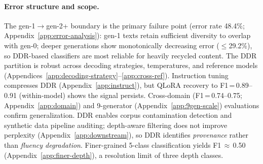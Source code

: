 \paragraph{Error structure and scope.}
 The gen-1$\to$gen-2+ boundary is the primary failure point (error rate 48.4\%; Appendix~\ref{app:error-analysis}): gen-1 texts retain sufficient diversity to overlap with gen-0; deeper generations show monotonically decreasing error ($\leq$29.2\%), so DDR-based classifiers are most reliable for heavily recycled content.
The DDR partition is robust across decoding strategies, temperatures, and reference models (Appendices~\ref{app:decoding-strategy}--\ref{app:cross-ref}).
Instruction tuning compresses DDR (Appendix~\ref{app:instruct}), but QLoRA recovery to F1\,=\,0.89--0.91 (within-model) shows the signal persists.
Cross-domain (F1\,=\,0.74--0.75; Appendix~\ref{app:domain}) and 9-generator (Appendix~\ref{app:9gen-scale}) evaluations confirm generalization.
DDR enables corpus contamination detection and synthetic data pipeline auditing; depth-aware filtering does not improve perplexity (Appendix~\ref{app:downstream}), so DDR identifies \emph{provenance} rather than \emph{fluency degradation}. Finer-grained 5-class classification yields F1\,$\approx$\,0.50 (Appendix~\ref{app:finer-depth}), a resolution limit of three depth classes.
